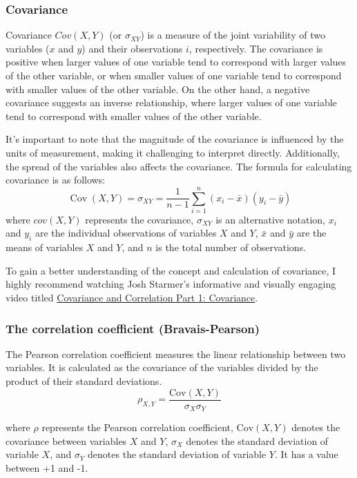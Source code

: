 \documentclass[
  12pt,
  oneside]{book}
\theoremstyle{definition}
\theoremstyle{definition}
\theoremstyle{definition}
\theoremstyle{definition}
\theoremstyle{remark}
\begin{document}
\hypertarget{covariance}{%
\subsubsection{Covariance}\label{covariance}}

Covariance \(Cov(X,Y)\) (or \(\sigma_{XY}\)) is a measure of the joint variability of two variables (\(x\) and \(y\)) and their observations \(i\), respectively.
The covariance is positive when larger values of one variable tend to correspond with larger values of the other variable, or when smaller values of one variable tend to correspond with smaller values of the other variable. On the other hand, a negative covariance suggests an inverse relationship, where larger values of one variable tend to correspond with smaller values of the other variable.

It's important to note that the magnitude of the covariance is influenced by the units of measurement, making it challenging to interpret directly. Additionally, the spread of the variables also affects the covariance.
The formula for calculating covariance is as follows:
\[
\operatorname{Cov}(X,Y)=\sigma_{XY}={\frac {1}{n-1}}\sum _{i=1}^{n}(x_{i}-\bar{x})(y_{i}-\bar{y})
\]
where \(cov(X,Y)\) represents the covariance, \(\sigma_{XY}\) is an alternative notation, \(x_i\) and \(y_i\) are the individual observations of variables \(X\) and \(Y\), \(\bar{x}\) and \(\bar{y}\) are the means of variables \(X\) and \(Y\), and \(n\) is the total number of observations.

To gain a better understanding of the concept and calculation of covariance, I highly recommend watching Josh Starmer's informative and visually engaging video titled \href{https://youtu.be/qtaqvPAeEJY}{Covariance and Correlation Part 1: Covariance}.

\hypertarget{the-correlation-coefficient-bravais-pearson}{%
\subsubsection{The correlation coefficient (Bravais-Pearson)}\label{the-correlation-coefficient-bravais-pearson}}

The Pearson correlation coefficient measures the linear relationship between two variables. It is calculated as the covariance of the variables divided by the product of their standard deviations.
\[
\rho_{X,Y} = \frac{{\text{Cov}(X, Y)}}{{\sigma_X \sigma_Y}}
\]

where \(\rho\) represents the Pearson correlation coefficient, \(\text{Cov}(X, Y)\) denotes the covariance between variables \(X\) and \(Y\), \(\sigma_X\) denotes the standard deviation of variable \(X\), and \(\sigma_Y\) denotes the standard deviation of variable \(Y\). It has a value between +1 and -1.
\end{document}
